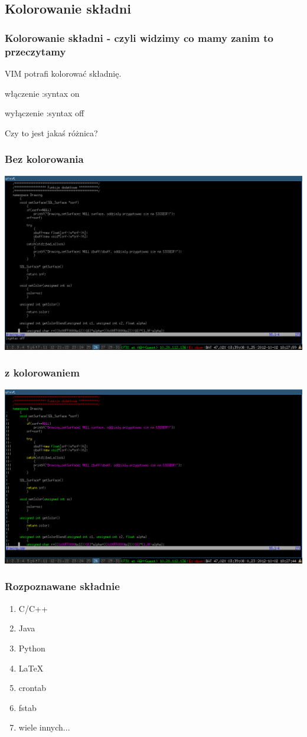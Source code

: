 \documentclass{beamer}
\begin{document}
\subsection{Kolorowanie składni}
\begin{frame}
	\frametitle{Kolorowanie składni - czyli widzimy co mamy zanim to przeczytamy}
	{
		VIM potrafi kolorować składnię.
	}
	\uncover<2->
	{
		\begin{block}{włączenie}
		:syntax on
		\end{block}
	}
	{
		\begin{block}{wyłączenie}
		:syntax off
		\end{block}
	}
	{
		Czy to jest jakaś różnica?
	}
\end{frame}
\begin{frame}
	\frametitle{Bez kolorowania}
	\includegraphics[width=\textwidth]{syntax_off.png}
\end{frame}
\begin{frame}
	\frametitle{z kolorowaniem}
	\includegraphics[width=\textwidth]{syntax_on.png}
\end{frame}
\begin{frame}
	\frametitle{Rozpoznawane składnie}
	\begin{enumerate}[<+->]
	\item C/C++
	\item Java
	\item Python
	\item \LaTeX
	\item crontab
	\item fstab
	\item wiele innych...
	\end{enumerate}
\end{frame}
\end{document}

